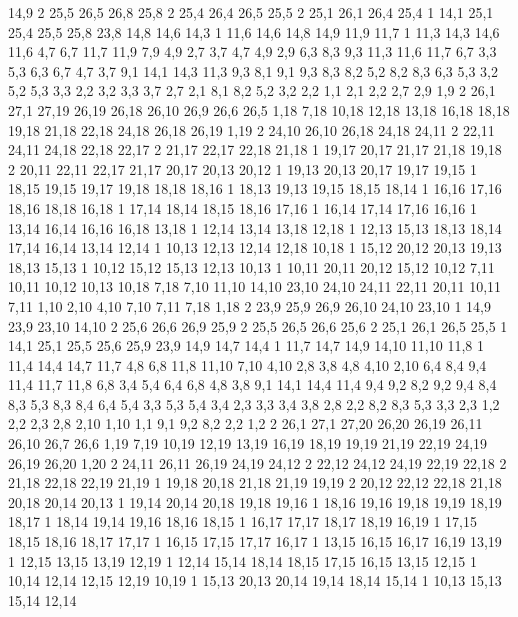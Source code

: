 14,9
2%
25,5
26,5
26,8
25,8
2%
25,4
26,4
26,5
25,5
2%
25,1
26,1
26,4
25,4
1%
14,1
25,1
25,4
25,5
25,8
23,8
14,8
14,6
14,3
1%
11,6
14,6
14,8
14,9
11,9
11,7
1%
11,3
14,3
14,6
11,6
%
4,7
6,7
11,7
11,9
7,9
4,9
%
2,7
3,7
4,7
4,9
2,9
%
6,3
8,3
9,3
11,3
11,6
11,7
6,7
%
3,3
5,3
6,3
6,7
4,7
3,7
%
9,1
14,1
14,3
11,3
9,3
%
8,1
9,1
9,3
8,3
8,2
%
5,2
8,2
8,3
6,3
5,3
%
3,2
5,2
5,3
3,3
%
2,2
3,2
3,3
3,7
2,7
%
2,1
8,1
8,2
5,2
3,2
2,2
%
1,1
2,1
2,2
2,7
2,9
1,9
2%
26,1
27,1
27,19
26,19
26,18
26,10
26,9
26,6
26,5
%
1,18
7,18
10,18
12,18
13,18
16,18
18,18
19,18
21,18
22,18
24,18
26,18
26,19
1,19
2%
24,10
26,10
26,18
24,18
24,11
2%
22,11
24,11
24,18
22,18
22,17
2%
21,17
22,17
22,18
21,18
1%
19,17
20,17
21,17
21,18
19,18
2%
20,11
22,11
22,17
21,17
20,17
20,13
20,12
1%
19,13
20,13
20,17
19,17
19,15
1%
18,15
19,15
19,17
19,18
18,18
18,16
1%
18,13
19,13
19,15
18,15
18,14
1%
16,16
17,16
18,16
18,18
16,18
1%
17,14
18,14
18,15
18,16
17,16
1%
16,14
17,14
17,16
16,16
1%
13,14
16,14
16,16
16,18
13,18
1%
12,14
13,14
13,18
12,18
1%
12,13
15,13
18,13
18,14
17,14
16,14
13,14
12,14
1%
10,13
12,13
12,14
12,18
10,18
1%
15,12
20,12
20,13
19,13
18,13
15,13
1%
10,12
15,12
15,13
12,13
10,13
1%
10,11
20,11
20,12
15,12
10,12
%
7,11
10,11
10,12
10,13
10,18
7,18
%
7,10
11,10
14,10
23,10
24,10
24,11
22,11
20,11
10,11
7,11
%
1,10
2,10
4,10
7,10
7,11
7,18
1,18
2%
23,9
25,9
26,9
26,10
24,10
23,10
1%
14,9
23,9
23,10
14,10
2%
25,6
26,6
26,9
25,9
2%
25,5
26,5
26,6
25,6
2%
25,1
26,1
26,5
25,5
1%
14,1
25,1
25,5
25,6
25,9
23,9
14,9
14,7
14,4
1%
11,7
14,7
14,9
14,10
11,10
11,8
1%
11,4
14,4
14,7
11,7
%
4,8
6,8
11,8
11,10
7,10
4,10
%
2,8
3,8
4,8
4,10
2,10
%
6,4
8,4
9,4
11,4
11,7
11,8
6,8
%
3,4
5,4
6,4
6,8
4,8
3,8
%
9,1
14,1
14,4
11,4
9,4
9,2
%
8,2
9,2
9,4
8,4
8,3
%
5,3
8,3
8,4
6,4
5,4
%
3,3
5,3
5,4
3,4
%
2,3
3,3
3,4
3,8
2,8
%
2,2
8,2
8,3
5,3
3,3
2,3
%
1,2
2,2
2,3
2,8
2,10
1,10
%
1,1
9,1
9,2
8,2
2,2
1,2
2%
26,1
27,1
27,20
26,20
26,19
26,11
26,10
26,7
26,6
%
1,19
7,19
10,19
12,19
13,19
16,19
18,19
19,19
21,19
22,19
24,19
26,19
26,20
1,20
2%
24,11
26,11
26,19
24,19
24,12
2%
22,12
24,12
24,19
22,19
22,18
2%
21,18
22,18
22,19
21,19
1%
19,18
20,18
21,18
21,19
19,19
2%
20,12
22,12
22,18
21,18
20,18
20,14
20,13
1%
19,14
20,14
20,18
19,18
19,16
1%
18,16
19,16
19,18
19,19
18,19
18,17
1%
18,14
19,14
19,16
18,16
18,15
1%
16,17
17,17
18,17
18,19
16,19
1%
17,15
18,15
18,16
18,17
17,17
1%
16,15
17,15
17,17
16,17
1%
13,15
16,15
16,17
16,19
13,19
1%
12,15
13,15
13,19
12,19
1%
12,14
15,14
18,14
18,15
17,15
16,15
13,15
12,15
1%
10,14
12,14
12,15
12,19
10,19
1%
15,13
20,13
20,14
19,14
18,14
15,14
1%
10,13
15,13
15,14
12,14
